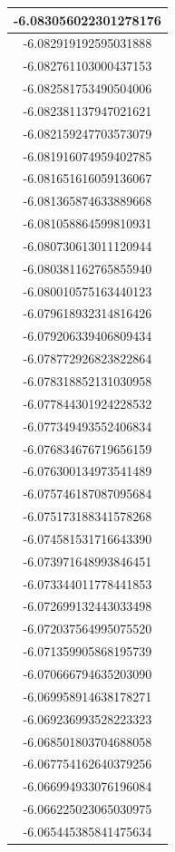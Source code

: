 \documentclass[a4paper]{article}
\begin{document}
\begin{table}[H]
\begin{multicols}{3}
\begin{tabular}{|c|}
-6.083056022301278176 \\ \hline
-6.082919192595031888 \\ \hline
-6.082761103000437153 \\ \hline
-6.082581753490504006 \\ \hline
-6.082381137947021621 \\ \hline
-6.082159247703573079 \\ \hline
-6.081916074959402785 \\ \hline
-6.081651616059136067 \\ \hline
-6.081365874633889668 \\ \hline
-6.081058864599810931 \\ \hline
-6.080730613011120944 \\ \hline
-6.080381162765855940 \\ \hline
-6.080010575163440123 \\ \hline
-6.079618932314816426 \\ \hline
-6.079206339406809434 \\ \hline
-6.078772926823822864 \\ \hline
-6.078318852131030958 \\ \hline
-6.077844301924228532 \\ \hline
-6.077349493552406834 \\ \hline
-6.076834676719656159 \\ \hline
-6.076300134973541489 \\ \hline
-6.075746187087095684 \\ \hline
-6.075173188341578268 \\ \hline
-6.074581531716643390 \\ \hline
-6.073971648993846451 \\ \hline
-6.073344011778441853 \\ \hline
-6.072699132443033498 \\ \hline
-6.072037564995075520 \\ \hline
-6.071359905868195739 \\ \hline
-6.070666794635203090 \\ \hline
-6.069958914638178271 \\ \hline
-6.069236993528223323 \\ \hline
-6.068501803704688058 \\ \hline
-6.067754162640379256 \\ \hline
-6.066994933076196084 \\ \hline
-6.066225023065030975 \\ \hline
-6.065445385841475634 \\ \hline

\end{tabular}
\end{multicols}
\end{table}
\end{document}
